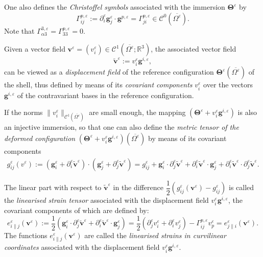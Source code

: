 \documentclass{amsart}
\begin{document}
One also defines the \emph{Christoffel symbols} associated with the immersion $\bm{\Theta}^\varepsilon$ by
$$
\Gamma^{p,\varepsilon}_{ij}:= \partial_i^\varepsilon \bm{g}^\varepsilon_j \cdot \bm{g}^{p,\varepsilon} = \Gamma^{p,\varepsilon}_{ji} \in \mathcal{C}^0(\overline{\Omega^\varepsilon}).
$$
Note that $\Gamma^{3,\varepsilon}_{\alpha 3} = \Gamma^{p, \varepsilon}_{33} = 0$.

Given a vector field $\bm{v}^\varepsilon = (v^\varepsilon_i) \in \mathcal{C}^1(\overline{\Omega^\varepsilon};\mathbb{R}^3)$, the associated vector field
$$
\tilde{\bm{v}}^\varepsilon := v^\varepsilon_i \bm{g}^{i,\varepsilon},
$$
can be viewed as a \emph{displacement field} of the reference configuration $\bm{\Theta}^\varepsilon(\overline{\Omega^\varepsilon})$ of the shell, thus defined by means of its \emph{covariant components} $v^\varepsilon_i$ over the vectors $\bm{g}^{i,\varepsilon}$ of the contravariant bases in the reference configuration.

If the norms $\|v^\varepsilon_i\|_{\mathcal{C}^1(\overline{\Omega^\varepsilon})}$ are small enough, the mapping $(\bm{\Theta}^\varepsilon + v^\varepsilon_i \bm{g}^{i,\varepsilon})$ is also an injective immersion, so that one can also define the  \emph{metric tensor of the deformed configuration} $(\bm{\Theta}^\varepsilon + v^\varepsilon_i \bm{g}^{i,\varepsilon})(\overline{\Omega^\varepsilon})$ by means of its covariant components
\begin{align*}
g^\varepsilon_{ij}(v^\varepsilon) := (\bm{g}^\varepsilon_i + \partial^\varepsilon_i \tilde{\bm{v}}^\varepsilon) \cdot (\bm{g}^\varepsilon_j + \partial^\varepsilon_j \tilde{\bm{v}}^\varepsilon)
= g^\varepsilon_{ij} + \bm{g}^\varepsilon_i \cdot \partial_j^\varepsilon \tilde{\bm{v}}^\varepsilon + \partial^\varepsilon_i \tilde{\bm{v}}^\varepsilon \cdot \bm{g}^\varepsilon_j + \partial_i^\varepsilon \tilde{\bm{v}}^\varepsilon \cdot \partial_j^\varepsilon \tilde{\bm{v}}^\varepsilon.
\end{align*}

The linear part with respect to $\tilde{\bm{v}}^\varepsilon$ in the difference $\dfrac{1}{2}(g^\varepsilon_{ij} (\bm{v}^\varepsilon) - g^\varepsilon_{ij})$ is called the \emph{linearised strain tensor} associated with the displacement field $v^\varepsilon_i \bm{g}^{i, \varepsilon}$, the covariant components of which are defined by:
$$
e^\varepsilon_{i\|j}(\bm{v}^\varepsilon) := \frac{1}{2} \left(\bm{g}^\varepsilon_i \cdot \partial_j^\varepsilon \tilde{\bm{v}}^\varepsilon + \partial^\varepsilon_i \tilde{\bm{v}}^\varepsilon \cdot \bm{g}^\varepsilon_j\right) = \frac{1}{2} (\partial^\varepsilon_j v^\varepsilon_i + \partial^\varepsilon_i v^\varepsilon_j) - \Gamma^{p,\varepsilon}_{ij} v^\varepsilon_p = e_{j\|i}^\varepsilon(\bm{v}^\varepsilon).
$$
The functions $e^\varepsilon_{i\|j}(\bm{v}^\varepsilon)$ are called the \emph{linearised strains in curvilinear coordinates} associated with the displacement field $v^\varepsilon_i \bm{g}^{i,\varepsilon}$.
\end{document}
